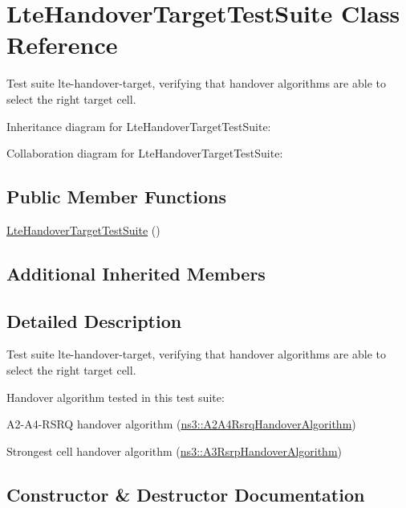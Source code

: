 \hypertarget{classLteHandoverTargetTestSuite}{}\section{Lte\+Handover\+Target\+Test\+Suite Class Reference}
\label{classLteHandoverTargetTestSuite}


Test suite {\ttfamily lte-\/handover-\/target}, verifying that handover algorithms are able to select the right target cell.  




Inheritance diagram for Lte\+Handover\+Target\+Test\+Suite\+:


Collaboration diagram for Lte\+Handover\+Target\+Test\+Suite\+:
\subsection*{Public Member Functions}
\begin{DoxyCompactItemize}
\item 
\hyperlink{classLteHandoverTargetTestSuite_aadfa86836dc5e533b0b195821a14b50f}{Lte\+Handover\+Target\+Test\+Suite} ()
\end{DoxyCompactItemize}
\subsection*{Additional Inherited Members}


\subsection{Detailed Description}
Test suite {\ttfamily lte-\/handover-\/target}, verifying that handover algorithms are able to select the right target cell. 

Handover algorithm tested in this test suite\+:
\begin{DoxyItemize}
\item A2-\/\+A4-\/\+R\+S\+RQ handover algorithm (\hyperlink{classns3_1_1A2A4RsrqHandoverAlgorithm}{ns3\+::\+A2\+A4\+Rsrq\+Handover\+Algorithm})
\item Strongest cell handover algorithm (\hyperlink{classns3_1_1A3RsrpHandoverAlgorithm}{ns3\+::\+A3\+Rsrp\+Handover\+Algorithm}) 
\end{DoxyItemize}

\subsection{Constructor \& Destructor Documentation}
